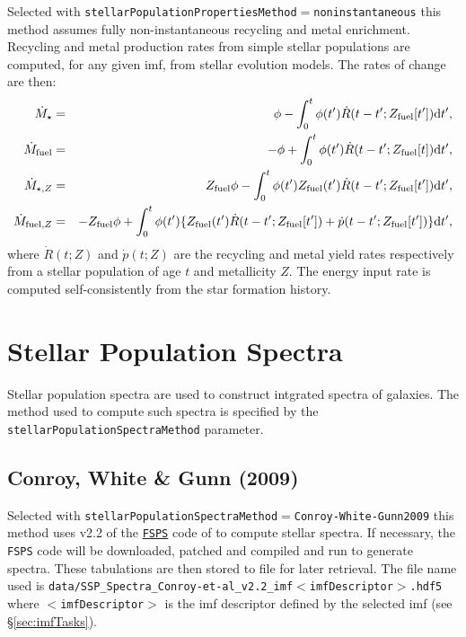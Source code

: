 Selected with {\tt stellarPopulationPropertiesMethod}$=${\tt noninstantaneous} this method assumes fully non-instantaneous recycling and metal enrichment. Recycling and metal production rates from simple stellar populations are computed, for any given \gls{imf}, from stellar evolution models. The rates of change are then:
\begin{eqnarray}
 \dot{M}_\star &=& \phi - \int_0^t \phi(t^\prime) \dot{R}(t-t^\prime;Z_{\rm fuel}[t^\prime]) \d t^\prime, \\
 \dot{M}_{\rm fuel} &=& -\phi + \int_0^t \phi(t^\prime) \dot{R}(t-t^\prime;Z_{\rm fuel}[t]) \d t^\prime, \\
 \dot{M}_{\star,Z} &=& Z_{\rm fuel} \phi - \int_0^t \phi(t^\prime) Z_{\rm fuel}(t^\prime)  \dot{R}(t-t^\prime;Z_{\rm fuel}[t^\prime]) \d t^\prime, \\
 \dot{M}_{{\rm fuel},Z} &=& -Z_{\rm fuel} \phi + \int_0^t  \phi(t^\prime) \{ Z_{\rm fuel}(t^\prime) \dot{R}(t-t^\prime;Z_{\rm fuel}[t^\prime]) + \dot{p}(t-t^\prime;Z_{\rm fuel}[t^\prime]) \} \d t^\prime, \\
\end{eqnarray}
where $\dot{R}(t;Z)$ and $\dot{p}(t;Z)$ are the recycling and metal yield rates respectively from a stellar population of age $t$ and metallicity $Z$. The energy input rate is computed self-consistently from the star formation history.

\section{Stellar Population Spectra}

Stellar population spectra are used to construct intgrated spectra of galaxies. The method used to compute such spectra is specified by the {\tt stellarPopulationSpectraMethod} parameter.

\subsection{Conroy, White \& Gunn (2009)}

Selected with {\tt stellarPopulationSpectraMethod}$=${\tt Conroy-White-Gunn2009} this method uses v2.2 of the \href{http://www.cfa.harvard.edu/~cconroy/FSPS.html}{{\tt FSPS}} code of \cite{conroy_propagation_2009} to compute stellar spectra. If necessary, the {\tt FSPS} code will be downloaded, patched and compiled and run to generate spectra. These tabulations are then stored to file for later retrieval. The file name used is {\tt data/SSP\_Spectra\_Conroy-et-al\_v2.2\_imf$<$imfDescriptor$>$.hdf5} where $<${\tt imfDescriptor}$>$ is the \gls{imf} descriptor defined by the selected \gls{imf} (see \S\ref{sec:imfTasks}).

